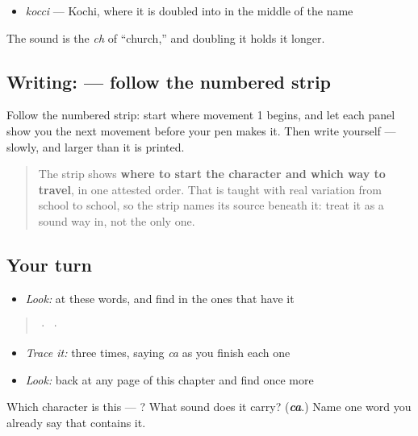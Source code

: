 \begin{itemize}
\raggedright
  \item \textbf{} \emph{kocci} — Kochi, where it is doubled into \textbf{} in the middle of the name
\end{itemize}

The sound is the \emph{ch} of \textquotedblleft{}church,\textquotedblright{} and doubling it holds it longer.

\subsection*{Writing:  — follow the numbered strip}

Follow the numbered strip: start where movement 1 begins, and let each panel show you the next movement before your pen makes it. Then write  yourself — slowly, and larger than it is printed.

\begin{quote}
The strip shows \textbf{where to start the character and which way to travel}, in one attested order. That is taught with real variation from school to school, so the strip names its source beneath it: treat it as a sound way in, not the only one.
\end{quote}

\subsection*{Your turn}
\begin{itemize}
\raggedright
  \item \emph{Look:} at these words, and find  in the ones that have it
\end{itemize}

\begin{quote}
  ·    ·  
\end{quote}

\begin{itemize}
\raggedright
  \item \emph{Trace it:}  three times, saying \emph{ca} as you finish each one
  \item \emph{Look:} back at any page of this chapter and find  once more
\end{itemize}

\begin{tcolorbox}[breakable,colback=teal!4,colframe=teal!35!black,title={Before you move on}]
Which character is this — ? What sound does it carry? (\emph{\textbf{ca}}.) Name one word you already say that contains it.
\end{tcolorbox}
